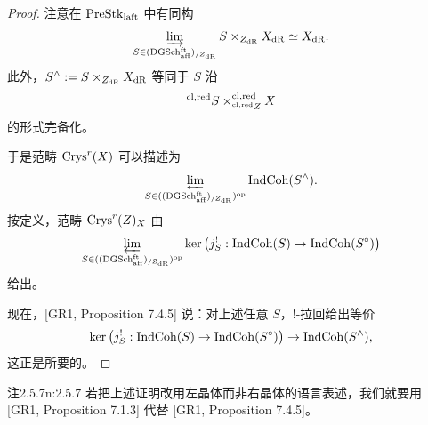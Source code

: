 \begin{proof}
注意在 $\mathrm{PreStk}_{\mathrm{laft}}$ 中有同构
\[
\varinjlim_{S\in(\mathrm{DGSch}_{\mathrm{aff}}^{\mathrm{ft}})_{/Z_{\mathrm{dR}}}}S\times_{Z_{\mathrm{dR}}}X_{\mathrm{dR}}\simeq X_{\mathrm{dR}}.
\]
此外，$S^{\wedge}:=S\times_{Z_{\mathrm{dR}}}X_{\mathrm{dR}}$ 等同于 $S$ 沿
\[
^{\mathrm{cl,red}} S\times_{^{\mathrm{cl,red}} Z}^{\mathrm{cl,red}} X
\]
的形式完备化。

于是范畴 $\mathrm{Crys}^r(X)$ 可以描述为
\[
\varprojlim_{S\in((\mathrm{DGSch}_{\mathrm{aff}}^{\mathrm{ft}})_{/Z_{\mathrm{dR}}})^{\mathrm{op}}}\mathrm{IndCoh}(S^{\wedge}).
\]
按定义，范畴 $\mathrm{Crys}^r(Z)_X$ 由
\[
\varprojlim_{S\in((\mathrm{DGSch}_{\mathrm{aff}}^{\mathrm{ft}})_{/Z_{\mathrm{dR}}})^{\mathrm{op}}}
\ker\big(j_S^!:\mathrm{IndCoh}(S)\to\mathrm{IndCoh}(S^{\circ})\big)
\]
给出。

现在，[GR1, Proposition 7.4.5] 说：对上述任意 $S$，$!$-拉回给出等价
\[
\ker\big(j_S^!:\mathrm{IndCoh}(S)\to\mathrm{IndCoh}(S^{\circ})\big)\to\mathrm{IndCoh}(S^{\wedge}),
\]
这正是所要的。
\end{proof}

\begin{othm}{注}{2.5.7}{n:2.5.7}
若把上述证明改用左晶体而非右晶体的语言表述，我们就要用 [GR1, Proposition 7.1.3] 代替 [GR1, Proposition 7.4.5]。
\end{othm}
